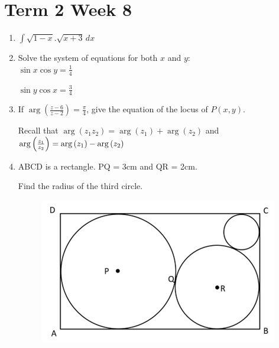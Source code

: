 \documentclass[../main.tex]{subfiles}
\begin{document}
\section*{Term 2 Week 8}
\begin{enumerate}[itemsep=1cm]
    \item 
    \(\int \sqrt{1-x}.\sqrt{x+3}\,dx\)

    \item 
    Solve the system of equations for both \(x\) and \(y\):\\
    $
    \sin{x}\cos{y}=\frac{1}{4}
    $

    $
    \sin{y}\cos{x}=\frac{3}{4}
    $
    
    \item
    If \(\arg{(\frac{z-6}{z-2})}=\frac{\pi}{4}\), give the equation of the locus of \(P(x,y)\).
    
    Recall that \(\arg{(z_1z_2)}=\arg{(z_1)}+\arg{(z_2)}\) and \(\arg{\Bigl(\frac{z_1}{z_2}\Bigr)}=\arg{(z_1)}-\arg{(z_2)}\)

    \item
    ABCD is a rectangle. PQ = 3cm and QR = 2cm.

    Find the radius of the third circle.
    
    \begin{figure}[H]
        \centering
        \includegraphics{images/t2w8q4.png}
    \end{figure}
   

    \end{enumerate}
\end{document}
